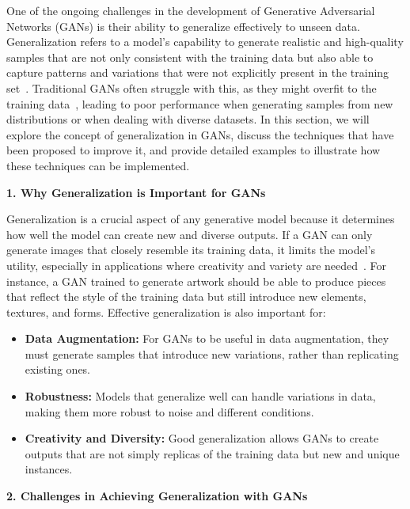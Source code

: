 One of the ongoing challenges in the development of Generative Adversarial Networks (GANs) is their ability to generalize effectively to unseen data. Generalization refers to a model's capability to generate realistic and high-quality samples that are not only consistent with the training data but also able to capture patterns and variations that were not explicitly present in the training set~\cite{gan2021research}. Traditional GANs often struggle with this, as they might overfit to the training data~\cite{de2021survey}, leading to poor performance when generating samples from new distributions or when dealing with diverse datasets. In this section, we will explore the concept of generalization in GANs, discuss the techniques that have been proposed to improve it, and provide detailed examples to illustrate how these techniques can be implemented.

\textbf{1. Why Generalization is Important for GANs}

Generalization is a crucial aspect of any generative model because it determines how well the model can create new and diverse outputs. If a GAN can only generate images that closely resemble its training data, it limits the model's utility, especially in applications where creativity and variety are needed~\cite{li2024survey}. For instance, a GAN trained to generate artwork should be able to produce pieces that reflect the style of the training data but still introduce new elements, textures, and forms. Effective generalization is also important for:
\begin{itemize}
    \item \textbf{Data Augmentation:} For GANs to be useful in data augmentation, they must generate samples that introduce new variations, rather than replicating existing ones.
    \item \textbf{Robustness:} Models that generalize well can handle variations in data, making them more robust to noise and different conditions.
    \item \textbf{Creativity and Diversity:} Good generalization allows GANs to create outputs that are not simply replicas of the training data but new and unique instances.
\end{itemize}

\textbf{2. Challenges in Achieving Generalization with GANs}

